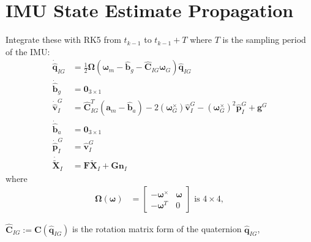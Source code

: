 \documentclass[10pt,letterpaper,fleqn,oneside]{article}
\newcommand{\nl}{\\[0.5em]}
\def\Vec#1{\mathbf{#1}} %
\newcommand{\bbm}{\begin{bmatrix}}
\newcommand{\ebm}{\end{bmatrix}}
\begin{document}
\section{IMU State Estimate Propagation}
Integrate these with RK5 from $t_{k-1}$ to $t_{k-1} + T$ where $T$ is the sampling period of the IMU:
\begin{align}
\dot{\hat{\Vec{q}}}_{I G} &= \frac{1}{2}\boldsymbol{\Omega}\left(\boldsymbol{\omega}_m - \hat{\Vec{b}}_g - \hat{\Vec{C}}_{I G} \boldsymbol{\omega}_G \right)\hat{\Vec{q}}_{I G} \nl
\dot{\hat{\Vec{b}}}_g  &= \Vec{0}_{3\times1} \nl
\dot{\hat{\Vec{v}}}^G_I &= \hat{\Vec{C}}_{I G}^T\left(\Vec{a}_m - \hat{\Vec{b}}_a\right) - 2\left(\boldsymbol{\omega}_G^\times\right)\hat{\Vec{v}}^G_I - \left(\boldsymbol{\omega}_G^\times\right)^2 \left.\hat{\Vec{p}}^G_I\right. + \Vec{g}^G \nl
\dot{\hat{\Vec{b}}}_a &= \Vec{0}_{3\times1} \nl
\dot{\hat{\Vec{p}}}^G_I &= \hat{\Vec{v}}^G_I \nl
\dot{\widetilde{\Vec{X}}}_I &= \Vec{F}\widetilde{\Vec{X}}_I + \Vec{G}\Vec{n}_I
\end{align}
where
\begin{align}
\boldsymbol{\Omega}\left(\boldsymbol{\omega}\right) &= \bbm -\boldsymbol{\omega}^\times & \boldsymbol{\omega} \nl
																										-\boldsymbol{\omega}^T & 0
																								\ebm 
																								\text{ is }4\times4,
\end{align}

$\hat{\Vec{C}}_{I G} := \Vec{C}(\hat{\Vec{q}}_{I G})$ is the rotation matrix form of the quaternion $\hat{\Vec{q}}_{I G}$,
\end{document}

